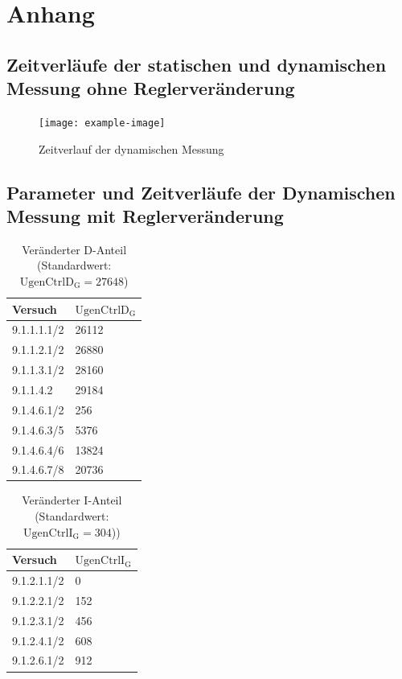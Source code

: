 \chapter{Anhang}
\label{chap:Anhang}
\section{Zeitverläufe der statischen und dynamischen Messung ohne Reglerveränderung}
\begin{figure}
	\centering
	\texttt{[image: example-image]}
	\caption{Zeitverlauf der dynamischen Messung}
	\label{fig:ZeitverlaufDynamischOhneRegleraenderung}
\end{figure}

\section{Parameter und Zeitverläufe der Dynamischen Messung mit Reglerveränderung}
\label{sec:ReglerparameterDynamischeMessung}

\begin{longtable}[]{ll}
    \caption{Veränderter D-Anteil (Standardwert: $\mathrm{UgenCtrlD_G}=27648$)}
    \label{tab:Parameter-D-Messung}
    \tabularnewline
    \toprule
    Versuch     & $\mathrm{UgenCtrlD_G}$ \\
    \midrule
    \endhead
    9.1.1.1.1/2 & 26112        \\
    9.1.1.2.1/2 & 26880        \\
    9.1.1.3.1/2 & 28160        \\
    9.1.1.4.2 & 29184        \\
    9.1.4.6.1/2 & 256          \\
    9.1.4.6.3/5 & 5376         \\
    9.1.4.6.4/6 & 13824        \\
    9.1.4.6.7/8 & 20736        \\
    \bottomrule
\end{longtable}

\begin{longtable}[]{ll}
    \caption{Veränderter I-Anteil (Standardwert: $\mathrm{UgenCtrlI_G}=304$))}
    \label{tab:Parameter-I-Messung}
    \tabularnewline
    \toprule
    Versuch     & $\mathrm{UgenCtrlI_G}$ \\
    \midrule
    \endhead
        9.1.2.1.1/2 & 0            \\
        9.1.2.2.1/2 & 152          \\
        9.1.2.3.1/2 & 456          \\
        9.1.2.4.1/2 & 608          \\
        9.1.2.6.1/2 & 912          \\
    \bottomrule
\end{longtable}

